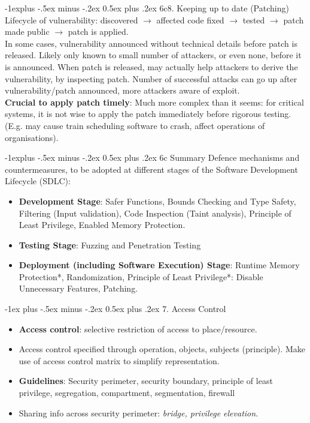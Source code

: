 \documentclass[10pt, landscape]{article}
\makeatletter
\renewcommand{\section}{\@startsection{section}{1}{0mm}%
                                {-1ex plus -.5ex minus -.2ex}%
                                {0.5ex plus .2ex}%
                                {\normalfont\large\bfseries}}
\renewcommand{\subsection}{\@startsection{subsection}{2}{0mm}%
                                {-1explus -.5ex minus -.2ex}%
                                {0.5ex plus .2ex}%
                                {\normalfont\normalsize\bfseries}}
\makeatother
\begin{document}
\begin{multicols*}{3}
\subsection{6c8. Keeping up to date (Patching)}
Lifecycle of vulnerability: discovered $\rightarrow$ affected code fixed $\rightarrow$  tested $\rightarrow$ patch made public $\rightarrow$
patch is applied. \\
In some cases, vulnerability announced without technical details before patch is released. Likely only known to small number of attackers, 
or even none, before it is announced. When patch is released, may actually help attackers to derive the vulnerability, by inspecting patch. Number of successful attacks can go up after vulnerability/patch announced, more attackers aware of exploit. \\
\textbf{Crucial to apply patch timely}: Much more complex than it seems: for critical systems, it is not wise to apply the patch immediately before rigorous testing. (E.g. may cause train scheduling software to crash, affect operations of organisations).

\subsection{6c Summary}
Defence mechanisms and countermeasures, to be adopted at different stages of the Software Development Lifecycle (SDLC):
\begin{itemize}
\item \textbf{Development Stage}: Safer Functions, Bounds Checking and Type Safety, Filtering (Input validation), Code Inspection (Taint analysis), Principle of Least Privilege, Enabled Memory Protection.
\item \textbf{Testing Stage}: Fuzzing and Penetration Testing
\item \textbf{Deployment (including Software Execution) Stage}: Runtime Memory Protection*, Randomization, Principle of Least Privilege*: Disable Unnecessary Features, Patching.
\end{itemize}



\vfill \null
\columnbreak

\fi

\section{7. Access Control}
\begin{itemize}
\item \textbf{Access control}: selective restriction of access to place/resource.
\item Access control specified through operation, objects, subjects (principle). Make use of access control matrix to simplify representation. 
\item \textbf{Guidelines}: Security perimeter, security boundary, principle of least privilege, segregation, compartment, segmentation, firewall
\item Sharing info across security perimeter: \textit{bridge, privilege elevation}.
\end{itemize}



\end{multicols*}
\end{document}
